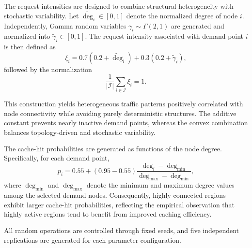 \documentclass[a4paper,11pt,reqno]{amsart}
\newcommand{\I}{\mathcal{I}}
\begin{document}
The request intensities are designed to combine structural heterogeneity with stochastic variability. Let $\widetilde{\deg}_i \in [0,1]$ denote the normalized degree of node $i$. Independently, Gamma random variables $\gamma_i \sim \Gamma(2,1)$ are generated and normalized into $\widetilde{\gamma}_i \in [0,1]$. The request intensity associated with demand point $i$ is then defined as
$$
\xi_i
=
0.7(0.2+\widetilde{\deg}_i)
+
0.3(0.2+\widetilde{\gamma}_i),
$$
followed by the normalization
$$
\frac{1}{|\I|}
\sum_{i\in\I}\xi_i
=
1.
$$

This construction yields heterogeneous traffic patterns positively correlated with node connectivity while avoiding purely deterministic structures. The additive constant prevents nearly inactive demand points, whereas the convex combination balances topology-driven and stochastic variability.

The cache-hit probabilities are generated as functions of the node degree. Specifically, for each demand point,
$$
p_i
=
0.55
+
(0.95-0.55)
\frac{\deg_i-\deg_{\min}}
{\deg_{\max}-\deg_{\min}},
$$
where $\deg_{\min}$ and $\deg_{\max}$ denote the minimum and maximum degree values among the selected demand nodes. Consequently, highly connected regions exhibit larger cache-hit probabilities, reflecting the empirical observation that highly active regions tend to benefit from improved caching efficiency.

All random operations are controlled through fixed seeds, and five independent replications are generated for each parameter configuration.
\end{document}
